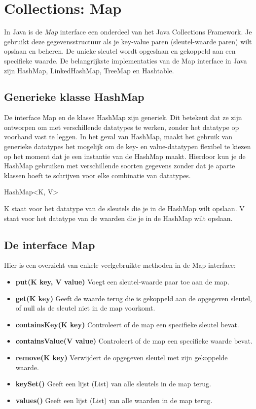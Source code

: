 \chapter{Collections: Map}

In Java is de \textit{Map} interface een onderdeel van het Java Collections Framework. 
Je gebruikt deze gegevensstructuur als je key-value paren (sleutel-waarde paren) wilt opslaan en beheren.  De unieke sleutel wordt opgeslaan en gekoppeld aan een specifieke waarde.  De belangrijkste implementaties van de Map interface in Java zijn HashMap, LinkedHashMap, TreeMap en Hashtable.

\section{Generieke klasse HashMap}

De interface Map en de klasse HashMap zijn generiek.  Dit betekent dat ze zijn ontworpen om met verschillende datatypes te werken, zonder het datatype op voorhand vast te leggen. In het geval van HashMap, maakt het gebruik van generieke datatypes het mogelijk om de key- en value-datatypen flexibel te kiezen op het moment dat je een instantie van de HashMap maakt. Hierdoor kun je de HashMap gebruiken met verschillende soorten gegevens zonder dat je aparte klassen hoeft te schrijven voor elke combinatie van datatypes.

HashMap<K, V>

K staat voor het datatype van de sleutels die je in de HashMap wilt opslaan.
V staat voor het datatype van de waarden die je in de HashMap wilt opslaan.

\section{De interface Map}

Hier is een overzicht van enkele veelgebruikte methoden in de Map interface:

\begin{itemize}
\item \textbf{put(K key, V value)} Voegt een sleutel-waarde paar toe aan de map.
\item \textbf{get(K key)} Geeft de waarde terug die is gekoppeld aan de opgegeven sleutel, of null als de sleutel niet in de map voorkomt.
\item \textbf{containsKey(K key)} Controleert of de map een specifieke sleutel bevat.
\item \textbf{containsValue(V value)} Controleert of de map een specifieke waarde bevat.
\item \textbf{remove(K key)} Verwijdert de opgegeven sleutel met zijn gekoppelde waarde.
\item \textbf{keySet()} Geeft een lijst (List) van alle sleutels in de map terug.
\item \textbf{values()} Geeft een lijst (List) van alle waarden in de map terug.
\end{itemize}



